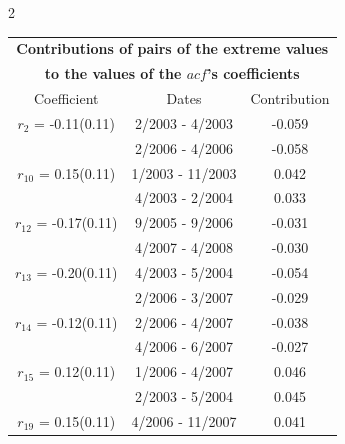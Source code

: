 
\thispagestyle{empty}
\begin{multicols}{2}{ 
\begin{tabular}{ccc}
\multicolumn{3}{c}{\textbf{Contributions of pairs of the extreme values} }  \vspace{-.10in}  \\ 
\multicolumn{3}{c}{ \textbf{to the values of the $acf$'s coefficients}} \\ 
\hline 
\hline                  Coefficient  &  Dates &  Contribution \\ 
\hline 
  $r_{ 2}$ = -0.11(0.11) &       2/2003 -  4/2003 &       -0.059    \vspace{-.10in} \\ 
  &        2/2006 -  4/2006 &       -0.058  \vspace{-.02in}   \\ \hline 
    $r_{10}$ = 0.15(0.11) &       1/2003 - 11/2003 &        0.042   \vspace{-.10in} \\  
&        4/2003 -  2/2004 &        0.033  \vspace{-.02in} \\ \hline 
  $r_{12}$ = -0.17(0.11) &       9/2005 -  9/2006 &       -0.031    \vspace{-.10in} \\ 
  &        4/2007 -  4/2008 &       -0.030  \vspace{-.02in}   \\ \hline 
    $r_{13}$ = -0.20(0.11) &       4/2003 -  5/2004 &       -0.054    \vspace{-.10in} \\ 
  &        2/2006 -  3/2007 &       -0.029  \vspace{-.02in}   \\ \hline 
    $r_{14}$ = -0.12(0.11) &       2/2006 -  4/2007 &       -0.038    \vspace{-.10in} \\ 
  &        4/2006 -  6/2007 &       -0.027  \vspace{-.02in}   \\ \hline 
    $r_{15}$ = 0.12(0.11) &       1/2006 -  4/2007 &        0.046   \vspace{-.10in} \\  
&        2/2003 -  5/2004 &        0.045  \vspace{-.02in} \\ \hline 
  $r_{19}$ = 0.15(0.11) &       4/2006 - 11/2007 &        0.041   \vspace{-.10in} \\  

\end{tabular}}
\end{multicols}
